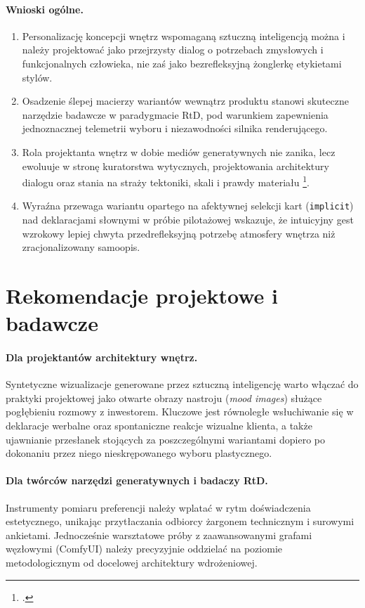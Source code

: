 \paragraph{Wnioski ogólne.}
\begin{enumerate}
  \item Personalizację koncepcji wnętrz wspomaganą sztuczną inteligencją można i należy projektować jako przejrzysty dialog o potrzebach zmysłowych i funkcjonalnych człowieka, nie zaś jako bezrefleksyjną żonglerkę etykietami stylów.
  \item Osadzenie ślepej macierzy wariantów wewnątrz produktu stanowi skuteczne narzędzie badawcze w paradygmacie RtD, pod warunkiem zapewnienia jednoznacznej telemetrii wyboru i niezawodności silnika renderującego.
  \item Rola projektanta wnętrz w dobie mediów generatywnych nie zanika, lecz ewoluuje w stronę kuratorstwa wytycznych, projektowania architektury dialogu oraz stania na straży tektoniki, skali i prawdy materiału \footcite{pallasmaa2012oczy}.
  \item Wyraźna przewaga wariantu opartego na afektywnej selekcji kart (\texttt{implicit}) nad deklaracjami słownymi w próbie pilotażowej wskazuje, że intuicyjny gest wzrokowy lepiej chwyta przedrefleksyjną potrzebę atmosfery wnętrza niż zracjonalizowany samoopis.
\end{enumerate}

\section{Rekomendacje projektowe i badawcze}
\label{ch10:sec:rekomendacje}

\paragraph{Dla projektantów architektury wnętrz.}
Syntetyczne wizualizacje generowane przez sztuczną inteligencję warto włączać do praktyki projektowej jako otwarte obrazy nastroju (\emph{mood images}) służące pogłębieniu rozmowy z inwestorem. Kluczowe jest równoległe wsłuchiwanie się w deklaracje werbalne oraz spontaniczne reakcje wizualne klienta, a także ujawnianie przesłanek stojących za poszczególnymi wariantami dopiero po dokonaniu przez niego nieskrępowanego wyboru plastycznego.

\paragraph{Dla twórców narzędzi generatywnych i badaczy RtD.}
Instrumenty pomiaru preferencji należy wplatać w rytm doświadczenia estetycznego, unikając przytłaczania odbiorcy żargonem technicznym i surowymi ankietami. Jednocześnie warsztatowe próby z zaawansowanymi grafami węzłowymi (ComfyUI) należy precyzyjnie oddzielać na poziomie metodologicznym od docelowej architektury wdrożeniowej.

